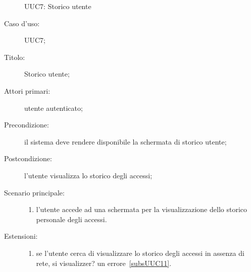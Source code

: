 \documentclass[../../../analisi-dei-requisiti.tex]{subfiles}
\begin{document}
\begin{figure}[H]
  \centering
  \caption{UUC7: Storico utente}%
  \label{fig:UUC7}
\end{figure}

\begin{description}
  \item[Caso d'uso:] UUC7;
  \item[Titolo:] Storico utente;
  \item[Attori primari:] utente autenticato;
  \item[Precondizione:]  il sistema deve rendere disponibile la schermata di storico utente;
  \item[Postcondizione:] l'utente visualizza lo storico degli accessi;
  \item[Scenario principale:]
        \begin{enumerate}
          \item l'utente accede ad una schermata per la visualizzazione dello storico personale degli accessi.
        \end{enumerate}
  \item[Estensioni:]
        \begin{enumerate}
          \item se l'utente cerca di visualizzare lo storico degli accessi in assenza di rete, si visualizzer? un errore~\ref{subsUUC11}.
        \end{enumerate}
\end{description}
\end{document}

